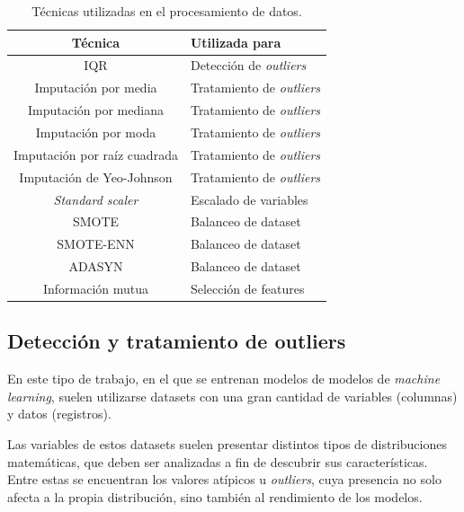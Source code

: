 \begin{table}[h]
	\centering
	\caption[Técnicas utilizadas]{Técnicas utilizadas en el procesamiento de datos.}
	\begin{tabular}{c l}
		\toprule
		\textbf{Técnica} 	 & \textbf{Utilizada para}\\
		\midrule
        IQR \citep{article:iqr}                                             & Detección de \textit{outliers} \\
		Imputación por media \citep{article:mean_median_imputation}         & Tratamiento de \textit{outliers} \\
        Imputación por mediana \citep{article:mean_median_imputation}       & Tratamiento de \textit{outliers} \\
        Imputación por moda \citep{article:mode_imputation}                 & Tratamiento de \textit{outliers} \\
        Imputación por raíz cuadrada \citep{article:sqrt_transformation}    & Tratamiento de \textit{outliers} \\
        Imputación de Yeo-Johnson \citep{article:yeojohnson}                & Tratamiento de \textit{outliers} \\
        \textit{Standard scaler} \citep{WEBSITE:standardscaler}             & Escalado de variables \\
        SMOTE \citep{article:smote}                         & Balanceo de dataset \\
        SMOTE-ENN \citep{article:smoteenn}                  & Balanceo de dataset \\
        ADASYN \citep{article:adasyn}                       & Balanceo de dataset \\
        Información mutua \citep{article:mutualinformation} & Selección de features \\
		\bottomrule
		\hline
	\end{tabular}
	\label{tab:procesamiento}
\end{table}

\subsection{Detección y tratamiento de outliers}

En este tipo de trabajo, en el que se entrenan modelos de modelos de \textit{machine learning}, suelen utilizarse datasets con una gran cantidad de variables (columnas) y datos (registros).

Las variables de estos datasets suelen presentar distintos tipos de distribuciones matemáticas, que deben ser analizadas a fin de descubrir sus características. Entre estas se encuentran los valores atípicos u \textit{outliers}, cuya presencia no solo afecta a la propia distribución, sino también al rendimiento de los modelos.

